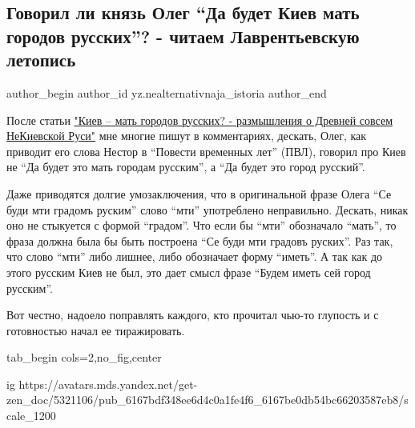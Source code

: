  
 
 
 
 
\subsection{Говорил ли князь Олег \enquote{Да будет Киев мать городов русских}? - читаем Лаврентьевскую летопись}
\label{sec:18_10_2021.yz.nealternativnaja_istoria.1.kiev_mti_gradom_ruskim}


\ifcmt
 author_begin
   author_id yz.nealternativnaja_istoria
 author_end
\fi

После статьи \href{https://zen.yandex.ru/media/sibguide/kiev--mat-gorodov-russkih-razmyshleniia-o-drevnei-sovsem-nekievskoi-rusi-615d307ed132a05135984517}{"Киев – мать городов русских? - размышления о Древней совсем
НеКиевской Руси"} мне многие пишут в комментариях, дескать, Олег, как приводит
его слова Нестор в \enquote{Повести временных лет} (ПВЛ), говорил про Киев не \enquote{Да будет
это мать городам русским}, а \enquote{Да будет это город русский}.

Даже приводятся долгие умозаключения, что в оригинальной фразе Олега \enquote{Се буди
мти градомъ руским} слово \enquote{мти} употреблено неправильно. Дескать, никак оно не
стыкуется с формой \enquote{градом}. Что если бы \enquote{мти} обозначало \enquote{мать}, то фраза
должна была бы быть построена \enquote{Се буди мти градовъ руских}. Раз так, что слово
\enquote{мти} либо лишнее, либо обозначает форму \enquote{иметь}. А так как до этого русским
Киев не был, это дает смысл фразе \enquote{Будем иметь сей город русским}.

Вот честно, надоело поправлять каждого, кто прочитал чью-то глупость и с
готовностью начал ее тиражировать.

\ifcmt
tab_begin cols=2,no_fig,center

  ig https://avatars.mds.yandex.net/get-zen_doc/5321106/pub_6167bdf348ee6d4c0a1fe4f6_6167be0db54bc66203587eb8/scale_1200

